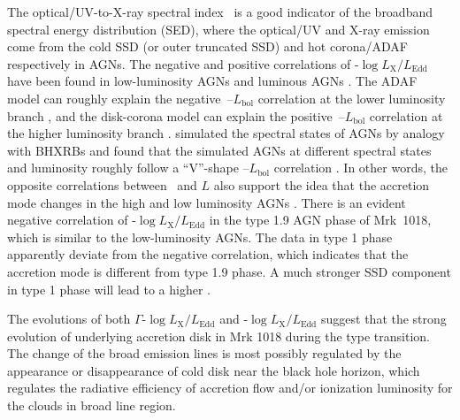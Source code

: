 The optical/UV-to-X-ray spectral index \alphaox\, is a good indicator of the broadband spectral energy distribution (SED), where the optical/UV and X-ray emission come from the cold SSD (or outer truncated SSD) and hot corona/ADAF respectively in AGNs. The negative and positive correlations of \alphaox-$\log{L_\mathrm{X}/L_\mathrm{Edd}}$ have been found in low-luminosity AGNs \citep[e.g.][]{2011ApJ...739...64X,2017MNRAS.471.2848L} and luminous AGNs \citep[e.g.][]{2010A&A...512A..34L, 2013A&A...550A..71V,2016ApJ...819..154L}. The ADAF model can roughly explain the negative \alphaox\,--$L_\mathrm{bol}$ correlation at the lower luminosity branch \citep{2011ApJ...739...64X,2017MNRAS.471.2848L}, and the disk-corona model can explain the positive \alphaox\,--$L_\mathrm{bol}$ correlation at the higher luminosity branch \citep{2017A&A...602A..79L, 2018MNRAS.480.1247K,2019A&A...628A.135A}. \citet{2011MNRAS.413.2259S} simulated the spectral states of AGNs by analogy with BHXRBs and found that the simulated AGNs at different spectral states and luminosity roughly follow a ``V''-shape \alphaox--$L_\mathrm{bol}$ correlation \citep[negative/positive correlation below/above a critical value, see also in ][]{2019ApJ...883...76R}. In other words, the opposite correlations between \alphaox\, and $L$ also support the idea that the accretion mode changes in the high and low luminosity AGNs \citep[see][]{2011MNRAS.413.2259S,2019ApJ...883...76R}.
There is an evident negative correlation of \alphaox-$\log{L_\mathrm{X}/L_\mathrm{Edd}}$ in the type 1.9 AGN phase of Mrk~1018, which is similar to the low-luminosity AGNs. The data in type 1 phase apparently deviate from the negative correlation, which indicates that the accretion mode is different from type 1.9 phase. A much stronger SSD component in type 1 phase will lead to a higher \alphaox. 

The evolutions of both $\Gamma$-$\log{L_\mathrm{X}/L_\mathrm{Edd}}$ and \alphaox-$\log{L_\mathrm{X}/L_\mathrm{Edd}}$ suggest that the strong evolution of underlying accretion disk in Mrk 1018 during the type transition. The change of the broad emission lines is most possibly regulated by the appearance or disappearance of cold disk near the black hole horizon, which regulates the radiative efficiency of accretion flow and/or ionization luminosity for the clouds in broad line region. 




